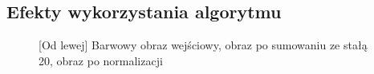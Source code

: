 \documentclass[a4paper,12pt, titlepage]{report}
\begin{document}
\subsection*{Efekty wykorzystania algorytmu}
\begin{figure}[h]
    \centering
    \caption{[Od lewej] Barwowy obraz wejściowy, obraz po sumowaniu ze stałą 20, obraz po normalizacji}%
    \label{fig:geo_after_grey1}%
\end{figure}
\FloatBarrier
\end{document}
